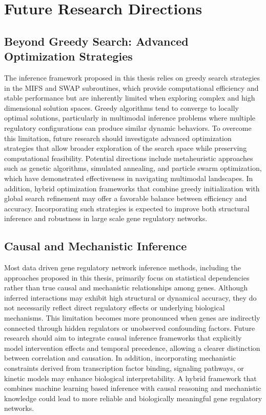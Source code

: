 \section{Future Research Directions}
\subsection{Beyond Greedy Search: Advanced Optimization Strategies}
The inference framework proposed in this thesis relies on greedy search strategies in the MIFS and SWAP subroutines, which provide computational efficiency and stable performance but are inherently limited when exploring complex and high dimensional solution spaces. Greedy algorithms tend to converge to locally optimal solutions, particularly in multimodal inference problems where multiple regulatory configurations can produce similar dynamic behaviors. To overcome this limitation, future research should investigate advanced optimization strategies that allow broader exploration of the search space while preserving computational feasibility. Potential directions include metaheuristic approaches such as genetic algorithms, simulated annealing, and particle swarm optimization, which have demonstrated effectiveness in navigating multimodal landscapes. In addition, hybrid optimization frameworks that combine greedy initialization with global search refinement may offer a favorable balance between efficiency and accuracy. Incorporating such strategies is expected to improve both structural inference and robustness in large scale gene regulatory networks.
\subsection{Causal and Mechanistic Inference}
Most data driven gene regulatory network inference methods, including the approaches proposed in this thesis, primarily focus on statistical dependencies rather than true causal and mechanistic relationships among genes. Although inferred interactions may exhibit high structural or dynamical accuracy, they do not necessarily reflect direct regulatory effects or underlying biological mechanisms. This limitation becomes more pronounced when genes are indirectly connected through hidden regulators or unobserved confounding factors. Future research should aim to integrate causal inference frameworks that explicitly model intervention effects and temporal precedence, allowing a clearer distinction between correlation and causation. In addition, incorporating mechanistic constraints derived from transcription factor binding, signaling pathways, or kinetic models may enhance biological interpretability. A hybrid framework that combines machine learning based inference with causal reasoning and mechanistic knowledge could lead to more reliable and biologically meaningful gene regulatory networks.

